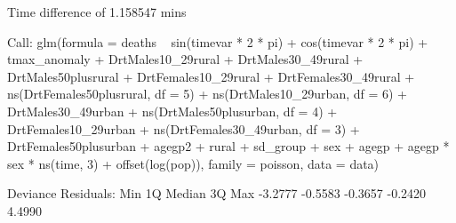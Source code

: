 \documentclass[a4paper]{article}                %
\begin{document}
\begin{Schunk}
\begin{Soutput}
Time difference of 1.158547 mins
\end{Soutput}
\begin{Soutput}
Call:
glm(formula = deaths ~ sin(timevar * 2 * pi) + cos(timevar * 
    2 * pi) + tmax_anomaly + DrtMales10_29rural + DrtMales30_49rural + 
    DrtMales50plusrural + DrtFemales10_29rural + DrtFemales30_49rural + 
    ns(DrtFemales50plusrural, df = 5) + ns(DrtMales10_29urban, 
    df = 6) + DrtMales30_49urban + ns(DrtMales50plusurban, df = 4) + 
    DrtFemales10_29urban + ns(DrtFemales30_49urban, df = 3) + 
    DrtFemales50plusurban + agegp2 + rural + sd_group + sex + 
    agegp + agegp * sex * ns(time, 3) + offset(log(pop)), family = poisson, 
    data = data)

Deviance Residuals: 
    Min       1Q   Median       3Q      Max  
-3.2777  -0.5583  -0.3657  -0.2420   4.4990  


\end{Soutput}
\end{Schunk}
\end{document}

